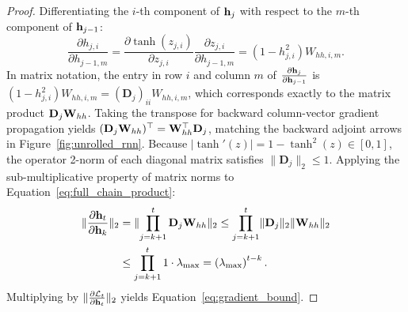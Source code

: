 \documentclass[../../main.tex]{subfiles}
\begin{document}
\begin{proof}
Differentiating the $i$-th component of $\mathbf{h}_j$ with respect to the $m$-th component of $\mathbf{h}_{j-1}$:
\[
\frac{\partial h_{j, i}}{\partial h_{j-1, m}} = \frac{\partial \tanh(z_{j, i})}{\partial z_{j, i}} \frac{\partial z_{j, i}}{\partial h_{j-1, m}} = (1 - h_{j, i}^2) W_{hh, i, m}.
\]
In matrix notation, the entry in row $i$ and column $m$ of $\frac{\partial \mathbf{h}_j}{\partial \mathbf{h}_{j-1}}$ is $(1 - h_{j, i}^2) W_{hh, i, m} = (\mathbf{D}_j)_{ii} W_{hh, i, m}$, which corresponds exactly to the matrix product $\mathbf{D}_j \mathbf{W}_{hh}$.
Taking the transpose for backward column-vector gradient propagation yields $(\mathbf{D}_j \mathbf{W}_{hh})^\top = \mathbf{W}_{hh}^\top \mathbf{D}_j$, matching the backward adjoint arrows in Figure~\ref{fig:unrolled_rnn}.
Because $|\tanh'(z)| = 1 - \tanh^2(z) \in [0, 1]$, the operator 2-norm of each diagonal matrix satisfies $\|\mathbf{D}_j\|_2 \le 1$. Applying the sub-multiplicative property of matrix norms to Equation~\eqref{eq:full_chain_product}:
\begin{align*}
\lVert\frac{\partial \mathbf{h}_t}{\partial \mathbf{h}_k}\rVert_2 &= \lVert\prod_{j=k+1}^t \mathbf{D}_j \mathbf{W}_{hh}\rVert_2 \le \prod_{j=k+1}^t \lVert\mathbf{D}_j\rVert_2 \lVert\mathbf{W}_{hh}\rVert_2 \\
&\le \prod_{j=k+1}^t 1 \cdot \lambda_{\max} = \left( \lambda_{\max} \right)^{t-k}.
\end{align*}
Multiplying by $\lVert\frac{\partial \mathcal{L}_t}{\partial \mathbf{h}_t}\rVert_2$ yields Equation~\eqref{eq:gradient_bound}.
\end{proof}
\end{document}
